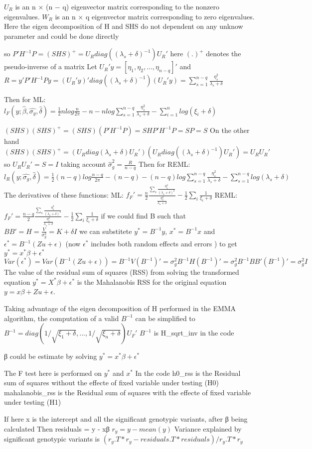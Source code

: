 \documentclass[11pt]{article}
\begin{document}
\(U_R\) is an n × (n − q) eigenvector matrix corresponding to the
nonzero eigenvalues. \(W_R\) is an n × q eigenvector matrix
corresponding to zero eigenvalues. Here the eigen decomposition of H and
SHS do not dependent on any unknow parameter and could be done directly

so \(P′H^{-1}P=(SHS)^+=U_Rdiag((λ_s+δ)^{-1})U_R′\) here \((.)^+\)
denotes the pseudo-inverse of a matrix Let
\(U_R′y = [η_1, η_2,...,η_{n−q}]′\) and
\(R=y′P′H^{-1}Py=(U_R′y)′diag((λ_s+δ)^{-1})(U_R′y)=\sum_{s=1}^{n-q}\frac{η_s^2}{λ_s+δ}\)

Then for ML:
\(l_F(y;\hat{β},\hat{σ_g},\hat{δ})=\frac{1}{2}nlog\frac{n}{2π}-n-nlog\sum_{s=1}^{n-q}\frac{η_s^2}{λ_s+δ}-\sum_{i=1}^{n}log(ξ_i+δ)\)

\((SHS)(SHS)^+ = (SHS)(P′H^{-1}P)=SHP′H^{-1}P=SP=S\) On the other hand
\((SHS)(SHS)^+=(U_Rdiag(λ_s+δ)U_R′)(U_Rdiag((λ_s+δ)^{-1})U_R′)=U_RU_R′\)
so \(U_RU_R′=S=I\) taking account \(\hat{σ}_g^2 = \frac{R}{n-q}\) Then
for REML:
\(l_R(y;\hat{σ_g},\hat{δ})=\frac{1}{2}(n-q)log\frac{n-q}{2π}-(n-q)-(n-q)log\sum_{s=1}^{n-q}\frac{η_s^2}{λ_s+δ}-\sum_{s=1}^{n-q}log(λ_s+δ)\)
The derivatives of these functions: ML:
\(f_F′=\frac{n}{2}\frac{\sum_s{\frac{η_s^2}{(λ_s+δ)^2}}}{\frac{η_s^2}{λ_s+δ}}-\frac{1}{2}\sum_i{\frac{1}{ξ_i+δ}}\)
REML:
\(f_F′=\frac{n-q}{2}\frac{\sum_s{\frac{η_s^2}{(λ_s+δ)^2}}}{\frac{η_s^2}{λ_s+δ}}-\frac{1}{2}\sum_i{\frac{1}{ξ_i+δ}}\)
if we could find B such that \(BB′ = H = \frac{V}{σ_g^2}=K+δI\) we can
substitete \(y^*=B^{-1}y\), \(x^*=B^{-1}x\) and \(ϵ^*=B^{-1}(Zu+ϵ)\)
(now \(ϵ^*\) includes both random effects and errors ) to get
\(y^*=x^*β+ϵ^*\)
\(Var(ϵ^*)=Var(B^{-1}(Zu+ϵ))=B^{-1}V(B^{-1})′=σ_g^2B^{-1}H(B^{-1})′=σ_g^2B^{-1}BB′(B^{-1})′=σ_g^2I\)
The value of the residual sum of squares (RSS) from solving the
transformed equation \(y^* = X^*\beta + \epsilon^*\) is the Mahalanobis
RSS for the original equation \(y = x\beta + Zu + \epsilon\).

Taking advantage of the eigen decomposition of H performed in the EMMA
algorithm, the computation of a valid \(B^{-1}\) can be simplified to
\(B^{-1} = diag(1/\sqrt{\xi_1 + \delta}, ..., 1/\sqrt{\xi_n + \delta}) U_F'\)
\(B^{-1}\) is H\_sqrt\_inv in the code

 β could be estimate by solving \(y^*=x^*β+ϵ^*\)

The F test here is performed on \(y^*\) and \(x^*\) In the code h0\_rss
is the Residual sum of squares without the effecte of fixed variable
under testing (H0) mahalanobis\_rss is the Residual sum of squares with
the effecte of fixed variable under testing (H1)

 If here x is the intercept and all the significant genotypic variants,
after β being calculated Then residuals = y - xβ \(r_y = y-mean(y)\)
Variance explained by significant genotypic variants is
\(( r_y.T*r_y-residuals.T * residuals ) / r_y.T*r_y\)


    
    
    
    
\end{document}
